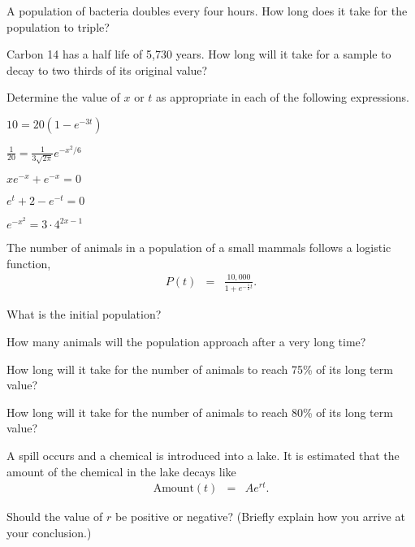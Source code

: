 \begin{problem}
\item A population of bacteria doubles every four hours. How long does
  it take for the population to triple?
  \vfill
\item Carbon 14 has a half life of 5,730 years. How long will it take
  for a sample to decay to two thirds of its original value?
  \vfill
\clearpage

\item Determine the value of $x$ or $t$ as appropriate in each of the following expressions.
  \begin{subproblem}
  \item $10 = 20\left( 1 - e^{-3t} \right)$
    \vfill
  \item $\frac{1}{20} =  \frac{1}{3\sqrt{2\pi}} e^{-x^2/6}$
    \vfill
  \item $xe^{-x} + e^{-x} = 0$
    \vfill
    \clearpage
  \item $e^{t} + 2 - e^{-t} = 0$
    \vfill
  \item $e^{-x^2} = 3\cdot 4^{2x-1}$
    \vfill
  \end{subproblem}

  \clearpage

\item The number of animals in a population of a small mammals follows
  a logistic function,
  \begin{eqnarray*}
    P(t) & = & \frac{10,000}{1+e^{-\frac{1}{2}t}}.
  \end{eqnarray*}
  \begin{subproblem}
  \item What is the initial population?
    \vspace{4em}
  \item How many animals will the population approach after a very
    long time?
    \vspace{4em}
  \item How long will it take for the number of animals to reach 75\%
    of its long term value?
    \vfill
  \item How long will it take for the number of animals to reach 80\%
    of its long term value?
    \vfill
  \end{subproblem}

\clearpage

\item A spill occurs and a chemical is introduced into a lake. It is
  estimated that the amount of the chemical in the lake decays like
  \begin{eqnarray*}
    \mathrm{Amount}(t) & = & A e^{rt}.
  \end{eqnarray*}
  \begin{subproblem}
  \item Should the value of $r$ be positive or negative? (Briefly
    explain how you arrive at your conclusion.)
    \vspace{5em}


\end{subproblem}
\end{problem}
